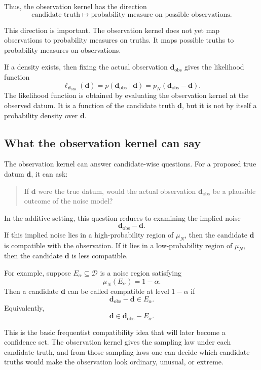 \documentclass[11pt]{article}
\newcommand{\Dspace}{\mathcal D}
\newcommand{\muN}{\mu_N}
\newcommand{\dobs}{\mathbf d_{\mathrm{obs}}}
\begin{document}
Thus, the observation kernel has the direction
\[
    \text{candidate truth}
    \longmapsto
    \text{probability measure on possible observations}.
\]

This direction is important. The observation kernel does not yet map observations to probability measures on truths. It maps possible truths to probability measures on observations.

If a density exists, then fixing the actual observation \(\dobs\) gives the likelihood function
\[
    \ell_{\dobs}(\mathbf d)
    =
    p(\dobs\mid \mathbf d)
    =
    p_N(\dobs-\mathbf d).
\]
The likelihood function is obtained by evaluating the observation kernel at the observed datum. It is a function of the candidate truth \(\mathbf d\), but it is not by itself a probability density over \(\mathbf d\).

\subsection{What the observation kernel can say}

The observation kernel can answer candidate-wise questions. For a proposed true datum \(\mathbf d\), it can ask:

\begin{quote}
    If \(\mathbf d\) were the true datum, would the actual observation \(\dobs\) be a plausible outcome of the noise model?
\end{quote}

In the additive setting, this question reduces to examining the implied noise
\[
    \dobs-\mathbf d.
\]
If this implied noise lies in a high-probability region of \(\muN\), then the candidate \(\mathbf d\) is compatible with the observation. If it lies in a low-probability region of \(\muN\), then the candidate \(\mathbf d\) is less compatible.

For example, suppose \(E_{\alpha}\subseteq\Dspace\) is a noise region satisfying
\[
    \muN(E_{\alpha})=1-\alpha.
\]
Then a candidate \(\mathbf d\) can be called compatible at level \(1-\alpha\) if
\[
    \dobs-\mathbf d\in E_{\alpha}.
\]
Equivalently,
\[
    \mathbf d\in \dobs-E_{\alpha}.
\]

This is the basic frequentist compatibility idea that will later become a confidence set. The observation kernel gives the sampling law under each candidate truth, and from those sampling laws one can decide which candidate truths would make the observation look ordinary, unusual, or extreme.
\end{document}
